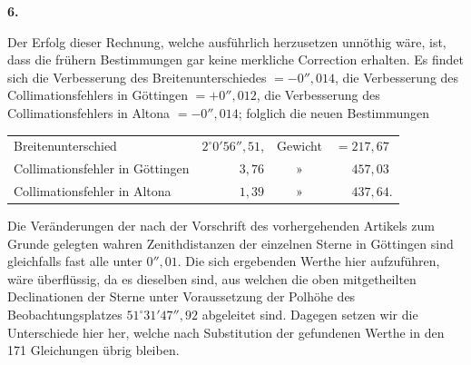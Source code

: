 \begin{center}\textbf{6.}\end{center}

Der Erfolg dieser Rechnung, welche ausführlich herzusetzen unnöthig
wäre, ist, dass die frühern Bestimmungen gar keine merkliche Correction
erhalten. Es findet sich die Verbesserung des Breitenunterschiedes \(=-0''{,}014\),
die Verbesserung des Collimationsfehlers in Göttingen \(=+0''{,}012\), die
Verbesserung des Collimationsfehlers in Altona \(=-0''{,}014\); folglich die neuen
Bestimmungen
\begin{center}
\begin{tabular}{@{}l@{\quad}r@{\enspace}c@{\enspace}l@{}}
Breitenunterschied & \(2^\circ0'56''{,}51\), & Gewicht & \(=217{,}67\)\\
Collimationsfehler in Göttingen & \(3{,}76\) & » & \(\phantom{=}457{,}03\)\\
Collimationsfehler in Altona & \(1{,}39\) & » & \(\phantom{=}437{,}64\).
\end{tabular}
\end{center}

Die Veränderungen der nach der Vorschrift des vorhergehenden Artikels
zum Grunde gelegten wahren Zenithdistanzen der einzelnen Sterne in Göttingen
sind gleichfalls fast alle unter \(0''{,}01\). Die sich ergebenden Werthe hier
aufzuführen, wäre überflüssig, da es dieselben sind, aus welchen die oben
mitgetheilten Declinationen der Sterne unter Voraussetzung der Polhöhe des
Beobachtungsplatzes \(51^\circ31'47''{,}92\) abgeleitet sind. Dagegen setzen wir die
Unterschiede hier her, welche nach Substitution der gefundenen Werthe in den
171 Gleichungen übrig bleiben.

